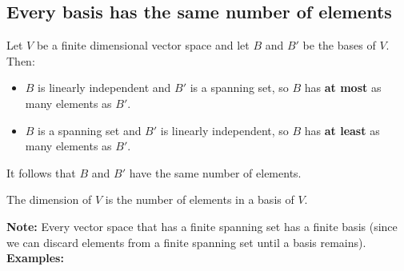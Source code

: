 \documentclass[a4paper, 9pt]{extarticle}
\begin{document}
\subsection{Every basis has the same number of elements}
Let $V$ be a finite dimensional vector space and let $B$ and $B'$ be the bases of $V$. Then:
\begin{itemize}
  \item $B$ is linearly independent and $B'$ is a spanning set, so $B$ has \textbf{at most} as many elements as $B'$.
  \item $B$ is a spanning set and $B'$ is linearly independent, so $B$ has \textbf{at least} as many elements as $B'$.
\end{itemize}
It follows that $B$ and $B'$ have the same number of elements.
\begin{definitionbox}{}{}
  The dimension of $V$ is the number of elements in a basis of $V$.
\end{definitionbox}
\noindent \textbf{Note:} Every vector space that has a finite spanning set has a finite basis
(since we can discard elements from a finite spanning set until a basis
remains).\\[2ex]
\textbf{Examples:}
\end{document}
